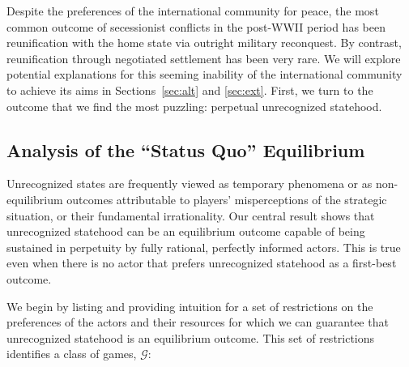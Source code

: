 \documentclass[11pt,letterpaper, notitlepage]{article}
\begin{document}
Despite the preferences of the international community for peace, the most common outcome of secessionist conflicts in the post-WWII period has been reunification with the home state via outright military reconquest. By contrast, reunification through negotiated settlement has been very rare. We will explore potential explanations for this seeming inability of the international community to achieve its aims in Sections~\ref{sec:alt} and \ref{sec:ext}. First, we turn to the outcome that we find the most puzzling: perpetual unrecognized statehood.

\subsection{Analysis of the ``Status Quo'' Equilibrium} 
\label{sec:mainproof}
Unrecognized states are frequently viewed as temporary phenomena or as non-equilibrium outcomes attributable to players' misperceptions of the strategic situation, or their fundamental irrationality. Our central result shows that unrecognized statehood can be an equilibrium outcome capable of being sustained in perpetuity by fully rational, perfectly informed actors. This is true even when there is no actor that prefers unrecognized statehood as a first-best outcome.

We begin by listing and providing intuition for a set of restrictions on the preferences of the actors and their resources for which we can guarantee that unrecognized statehood is an equilibrium outcome. This set of restrictions identifies a class of games, $\mathcal{G}$: 
\end{document}
